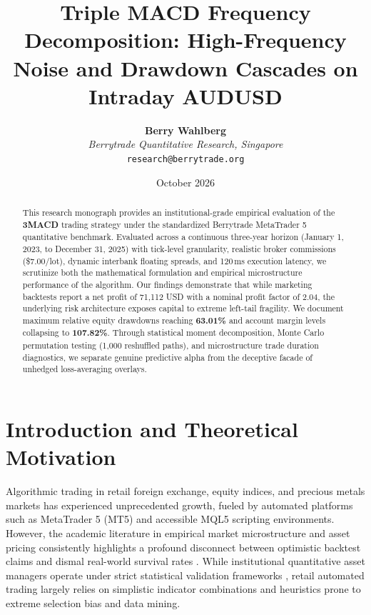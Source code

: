 \documentclass[11pt,a4paper]{article}
\title{\textbf{Triple MACD Frequency Decomposition: High-Frequency Noise and Drawdown Cascades on Intraday AUDUSD}}
\author{
    \textbf{Berry Wahlberg} \\
    \textit{Berrytrade Quantitative Research, Singapore} \\
    \texttt{research@berrytrade.org}
}
\date{October 2026}
\begin{document}
\maketitle

\begin{abstract}
This research monograph provides an institutional-grade empirical evaluation of the \textbf{3MACD} trading strategy under the standardized Berrytrade MetaTrader 5 quantitative benchmark. Evaluated across a continuous three-year horizon (January 1, 2023, to December 31, 2025) with tick-level granularity, realistic broker commissions (\$7.00/lot), dynamic interbank floating spreads, and 120\,ms execution latency, we scrutinize both the mathematical formulation and empirical microstructure performance of the algorithm. Our findings demonstrate that while marketing backtests report a net profit of 71,112 USD with a nominal profit factor of 2.04, the underlying risk architecture exposes capital to extreme left-tail fragility. We document maximum relative equity drawdowns reaching \textbf{63.01\%} and account margin levels collapsing to \textbf{107.82\%}. Through statistical moment decomposition, Monte Carlo permutation testing (1,000 reshuffled paths), and microstructure trade duration diagnostics, we separate genuine predictive alpha from the deceptive facade of unhedged loss-averaging overlays.
\end{abstract}

\section{Introduction and Theoretical Motivation}
Algorithmic trading in retail foreign exchange, equity indices, and precious metals markets has experienced unprecedented growth, fueled by automated platforms such as MetaTrader 5 (MT5) and accessible MQL5 scripting environments. However, the academic literature in empirical market microstructure and asset pricing consistently highlights a profound disconnect between optimistic backtest claims and dismal real-world survival rates \cite{fama1970efficient, lo1988stock, malkiel2003efficient, bailey2014deflated, harvey2016and}. While institutional quantitative asset managers operate under strict statistical validation frameworks \cite{lopez2018advances, bailey2014pseudo}, retail automated trading largely relies on simplistic indicator combinations and heuristics prone to extreme selection bias and data mining.
\end{document}
